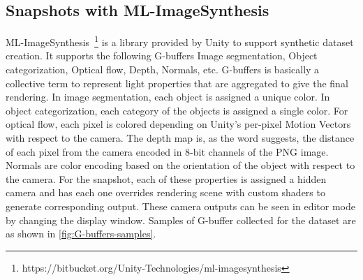 \subsection{Snapshots with ML-ImageSynthesis}\label{subsec:snapshots-with-ml-imagesynthesis}

ML-ImageSynthesis~\footnote{https://bitbucket.org/Unity-Technologies/ml-imagesynthesis} is a library provided by Unity to support synthetic dataset creation.
It supports the following G-buffers Image segmentation, Object categorization, Optical flow, Depth, Normals, etc.
G-buffers is basically a collective term to represent light properties that are aggregated to give the final rendering.
In image segmentation, each object is assigned a unique color.
In object categorization, each category of the objects is assigned a single color.
For optical flow, each pixel is colored depending on Unity's per-pixel Motion Vectors with respect to the camera.
The depth map is, as the word suggests, the distance of each pixel from the camera encoded in 8-bit channels of the PNG image.
Normals are color encoding based on the orientation of the object with respect to the camera.
For the snapshot, each of these properties is assigned a hidden camera and has each one overrides rendering scene with custom shaders to generate corresponding output.
These camera outputs can be seen in editor mode by changing the display window.
Samples of G-buffer collected for the dataset are as shown in \autoref{fig:G-buffers-samples}.

